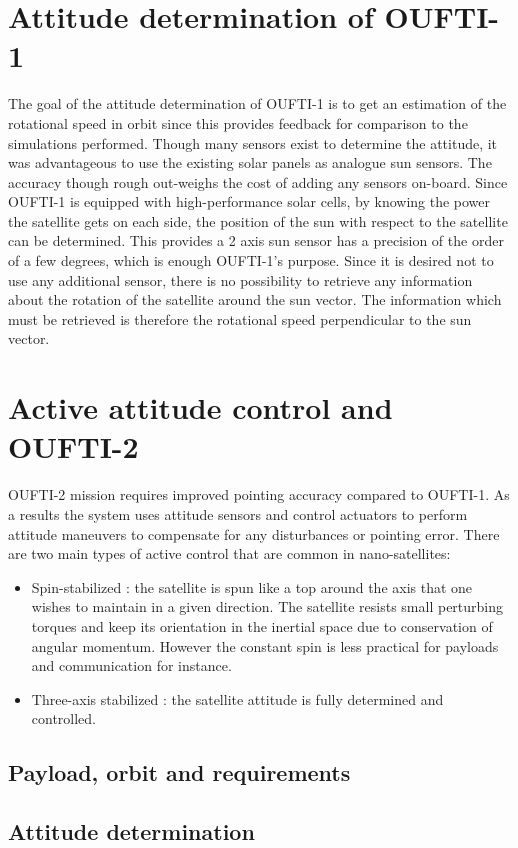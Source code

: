 \documentclass[12pt]{article}
\begin{document}
\section{Attitude determination of OUFTI-1}
The goal of the attitude determination of OUFTI-1 is to get an estimation of the rotational
speed in orbit since this provides feedback for comparison to the simulations performed.
Though many sensors exist to determine the attitude, it was advantageous to use
the existing solar panels as analogue sun sensors. The accuracy though rough out-weighs the cost of adding any sensors on-board. Since OUFTI-1 is equipped with high-performance solar cells, by knowing the power
the satellite gets on each side, the position of the sun with respect to the satellite can be
determined. This provides a 2 axis sun sensor has a precision of the order of a few degrees,
which is enough OUFTI-1's purpose. Since it is desired not to use any additional sensor, there
is no possibility to retrieve any information about the rotation of the satellite around the
sun vector. The information which must be retrieved is therefore the rotational speed
perpendicular to the sun vector.
\section{Active attitude control and OUFTI-2}
OUFTI-2 mission requires improved pointing accuracy compared to OUFTI-1. As a results the system uses attitude sensors and control actuators to perform attitude maneuvers to compensate for any disturbances or pointing error. There are two main types of active control that are common in nano-satellites:
\begin{itemize}
\item Spin-stabilized : the satellite is spun like a top around the axis that one wishes to maintain in a given direction. The satellite resists small perturbing torques and keep its orientation in the inertial space due to conservation of angular momentum. However the constant spin is less practical for payloads and communication for instance.
\item Three-axis stabilized : the satellite attitude is fully determined and controlled. 
\end{itemize}

\subsection{Payload, orbit and requirements}
\subsection{Attitude determination}
\end{document}
